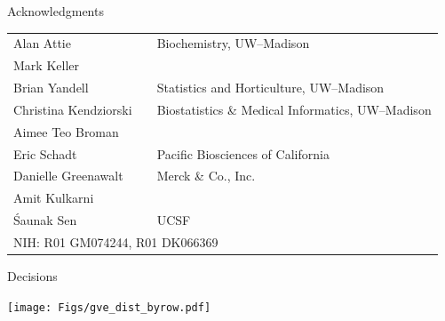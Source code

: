 \documentclass[12pt]{article}
\newcommand{\headsize}{\fontsize{35}{35} \selectfont}
\newcommand{\smallersize}{\fontsize{20}{25} \selectfont}
\begin{document}
\headsize \color{myyellow}
\hfill \begin{minipage}{5.75in}
\centering
Acknowledgments
\end{minipage}

\vspace{2cm} \color{mywhite} \smallersize

\hfill \begin{minipage}{10in}

\setlength{\tabcolsep}{5mm}
\begin{tabular}{lll}
Alan Attie&&
{\color{myblue} Biochemistry, UW--Madison} \\
Mark Keller &&
\\[24pt]

Brian Yandell &&
{\color{myblue} Statistics and Horticulture, UW--Madison} \\[24pt]

Christina Kendziorski &&
{\color{myblue} Biostatistics \& Medical Informatics, UW--Madison} \\
Aimee Teo Broman && \\[24pt]

Eric Schadt &&
{\color{myblue} Pacific Biosciences of California} \\[24pt]

Danielle Greenawalt &&
{\color{myblue} Merck \& Co., Inc.} \\
Amit Kulkarni && \\[24pt]

\'Saunak Sen &&
{\color{myblue} UCSF} \\[48pt]

\multicolumn{3}{l}{\color{mypink}NIH: \color{myblue} R01 GM074244, R01 DK066369}


\end{tabular}
\end{minipage}

\newpage


\headsize \color{myyellow}
\hfill \begin{minipage}{5.75in}
\centering
Decisions
\end{minipage}

\vfill

\centerline{\texttt{[image: Figs/gve\_dist\_byrow.pdf]}}
\end{document}

